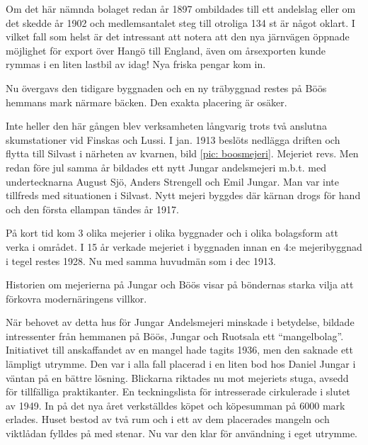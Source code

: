 Om det här nämnda bolaget redan år 1897 ombildades till ett andelslag eller om det skedde år 1902 och medlemsantalet steg till otroliga 134 st är något oklart. I vilket fall som helst är det intressant att notera att den nya järnvägen öppnade möjlighet för export över Hangö till England, även om årsexporten kunde rymmas i en liten lastbil av idag! Nya friska pengar kom in.

Nu övergavs den tidigare byggnaden och en ny träbyggnad restes på Böös hemmans mark närmare bäcken. Den exakta placering är osäker.

Inte heller den här gången blev verksamheten långvarig trots två anslutna skumstationer vid Finskas och Lussi. I jan. 1913 beslöts nedlägga driften och flytta till Silvast i närheten av kvarnen, bild \ref{pic: boosmejeri}. Mejeriet revs. Men redan före jul samma år bildades ett nytt Jungar andelsmejeri m.b.t. med undertecknarna August Sjö, Anders Strengell och Emil Jungar. Man var inte tillfreds med situationen i Silvast. Nytt mejeri byggdes där kärnan drogs för hand och den första ellampan tändes år 1917.

På kort tid kom 3 olika mejerier i olika byggnader och i olika bolagsform att verka i området. I 15 år verkade mejeriet i byggnaden innan en 4:e mejeribyggnad i tegel restes 1928. Nu med samma huvudmän som i dec 1913.

Historien om mejerierna på Jungar och Böös visar på böndernas starka vilja att förkovra modernäringens villkor.



%



%

När behovet av detta hus för Jungar Andelsmejeri minskade i betydelse, bildade intressenter från hemmanen på Böös, Jungar och Ruotsala ett ``mangelbolag''. Initiativet till anskaffandet av en mangel hade tagits 1936, men den saknade ett lämpligt utrymme. Den var i alla fall placerad i en liten bod hos Daniel Jungar i väntan på en bättre lösning. Blickarna riktades nu mot mejeriets stuga, avsedd för tillfälliga praktikanter. En teckningslista för intresserade cirkulerade i slutet av 1949. In på det nya året verkställdes köpet och köpesumman på 6000 mark erlades. Huset bestod av två rum och i ett av dem placerades mangeln och viktlådan fylldes på med stenar. Nu var den klar för användning i eget utrymme.

